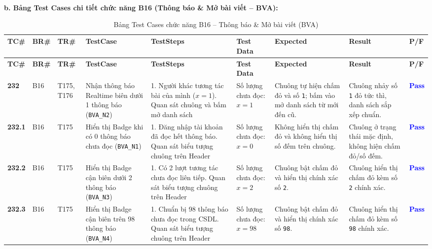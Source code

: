 \documentclass[11pt,a4paper]{article}
\begin{document}
\noindent\textbf{b. Bảng Test Cases chi tiết chức năng B16 (Thông báo \& Mở bài viết -- BVA):}
\begingroup
\scriptsize
\setlength{\tabcolsep}{3pt}
\begin{longtable}{|C{0.9cm}|C{0.7cm}|C{0.9cm}|L{2.0cm}|L{3.0cm}|L{2.25cm}|L{2.6cm}|L{2.5cm}|C{0.85cm}|}
\hline
{}
\textbf{TC\#} & \textbf{BR\#} & \textbf{TR\#} & \textbf{TestCase} & \textbf{TestSteps} & \textbf{Test Data} & \textbf{Expected} & \textbf{Result} & \textbf{P/F} \tabularnewline
\hline
\endfirsthead
\hline
{}
\textbf{TC\#} & \textbf{BR\#} & \textbf{TR\#} & \textbf{TestCase} & \textbf{TestSteps} & \textbf{Test Data} & \textbf{Expected} & \textbf{Result} & \textbf{P/F} \tabularnewline
\hline
\endhead
\hline
\endfoot
\hline
\caption{Bảng Test Cases chức năng B16 -- Thông báo \& Mở bài viết (BVA)}
\endlastfoot
\textbf{232} & B16 & T175, T176 & Nhận thông báo Realtime biên dưới 1 thông báo (\texttt{BVA\_N2}) & 1. Người khác tương tác bài của mình ($x = 1$). Quan sát chuông và bấm mở danh sách & Số lượng chưa đọc: $x = 1$ & Chuông tự hiện chấm đỏ và số \texttt{1}; bấm vào mở danh sách từ mới đến cũ. & Chuông nhảy số \texttt{1} đỏ tức thì, danh sách sắp xếp chuẩn. & \textcolor{blue}{\textbf{Pass}} \\ \hline
\textbf{232.1} & B16 & T175 & Hiển thị Badge khi có 0 thông báo chưa đọc (\texttt{BVA\_N1}) & 1. Đăng nhập tài khoản đã đọc hết thông báo. Quan sát biểu tượng chuông trên Header & Số lượng chưa đọc: $x = 0$ & Không hiển thị chấm đỏ và không hiển thị số đếm trên chuông. & Chuông ở trạng thái mặc định, không hiện chấm đỏ/số đếm. & \textcolor{blue}{\textbf{Pass}} \\ \hline
\textbf{232.2} & B16 & T175 & Hiển thị Badge cận biên dưới 2 thông báo (\texttt{BVA\_N3}) & 1. Có 2 lượt tương tác chưa đọc liên tiếp. Quan sát biểu tượng chuông trên Header & Số lượng chưa đọc: $x = 2$ & Chuông bật chấm đỏ và hiển thị chính xác số \texttt{2}. & Chuông hiển thị chấm đỏ kèm số \texttt{2} chính xác. & \textcolor{blue}{\textbf{Pass}} \\ \hline
\textbf{232.3} & B16 & T175 & Hiển thị Badge cận biên trên 98 thông báo (\texttt{BVA\_N4}) & 1. Chuẩn bị 98 thông báo chưa đọc trong CSDL. Quan sát biểu tượng chuông trên Header & Số lượng chưa đọc: $x = 98$ & Chuông bật chấm đỏ và hiển thị chính xác số \texttt{98}. & Chuông hiển thị chấm đỏ kèm số \texttt{98} chính xác. & \textcolor{blue}{\textbf{Pass}} \\ \hline

\end{longtable}
\end{document}
